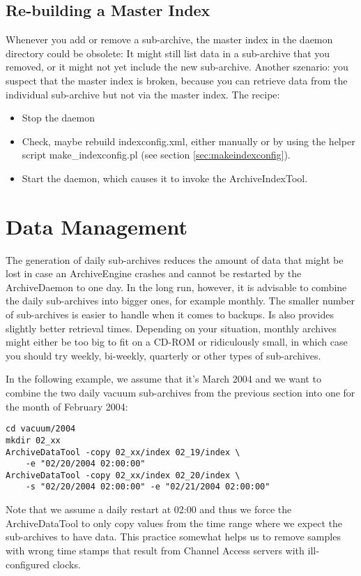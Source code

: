 \subsection{Re-building a Master Index}
Whenever you add or remove a sub-archive, the master index in the
daemon directory could be obsolete: It might still list data in a
sub-archive that you removed, or it might not yet include the new
sub-archive. Another szenario: you suspect that the master index is
broken, because you can retrieve data from the individual sub-archive
but not via the master index. The recipe:
\begin{itemize}
\item Stop the daemon
\item Check, maybe rebuild indexconfig.xml, either manually or by
  using the helper script make\_indexconfig.pl
  (see section  \ref{sec:makeindexconfig}).
\item Start the daemon, which causes it to invoke the ArchiveIndexTool.
\end{itemize}

\section{Data Management}
The generation of daily sub-archives reduces the amount of data that
might be lost in case an ArchiveEngine crashes and cannot be restarted
by the ArchiveDaemon to one day. In the long run, however, it is
advisable to combine the daily sub-archives into bigger ones, for
example monthly. The smaller number of sub-archives is easier to
handle when it comes to backups. Is also provides slightly better
retrieval times. Depending on your situation, monthly archives might either
be too big to fit on a CD-ROM or ridiculously small, in which case you
should try weekly, bi-weekly, quarterly or other types of sub-archives.

In the following example, we assume that it's March 2004 and we want
to combine the two daily vacuum sub-archives from the previous section
into one for the month of February 2004:
\begin{lstlisting}[frame=none,keywordstyle=\sffamily]
cd vacuum/2004
mkdir 02_xx
ArchiveDataTool -copy 02_xx/index 02_19/index \
    -e "02/20/2004 02:00:00"
ArchiveDataTool -copy 02_xx/index 02_20/index \
    -s "02/20/2004 02:00:00" -e "02/21/2004 02:00:00"
\end{lstlisting}
\noindent Note that we assume a daily restart at 02:00 and thus we
force the ArchiveDataTool to only copy values from the time range
where we expect the sub-archives to have data. This practice somewhat
helps us to remove samples with wrong time stamps that result from
Channel Access servers with ill-configured clocks.

